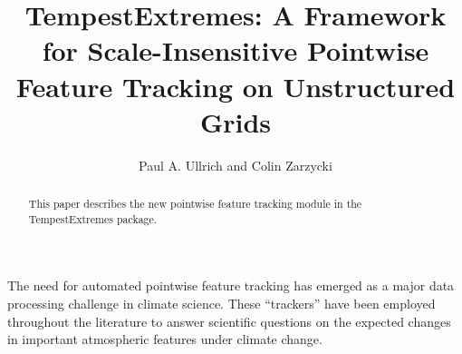 \documentclass[gmdd, hvmath, online]{copernicus_discussions}
\begin{document}
\linenumbers

\title{TempestExtremes:  A Framework for Scale-Insensitive Pointwise Feature Tracking on Unstructured Grids}

\author{Paul A. Ullrich and Colin Zarzycki}







\received{}
\pubdiscuss{} %
\revised{}
\accepted{}
\published{}




\maketitle  %



\begin{abstract}
This paper describes the new pointwise feature tracking module in the TempestExtremes package.
\end{abstract}





\introduction  %


The need for automated pointwise feature tracking has emerged as a major data processing challenge in climate science.  These ``trackers'' have been employed throughout the literature to answer scientific questions on the expected changes in important atmospheric features under climate change.
\end{document}
